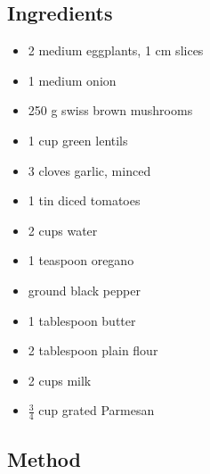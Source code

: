 \documentclass[11pt,a4paper]{article}
\begin{document}
\subsection*{Ingredients}

\begin{multicols}{2}

\begin{itemize}
  \item 2 medium eggplants, 1 cm slices
  \item 1 medium onion
  \item 250 \si{\gram} swiss brown mushrooms
  \item 1 cup green lentils
  \item 3 cloves garlic, minced
  \item 1 tin diced tomatoes
\end{itemize}

\columnbreak{}

\begin{itemize}
  \item 2 cups water
  \item 1 teaspoon oregano
  \item ground black pepper
  \item 1 tablespoon butter
  \item 2 tablespoon plain flour
  \item 2 cups milk
  \item $\frac{3}{4}$ cup grated Parmesan
\end{itemize}

\end{multicols}

\medskip

\subsection*{Method}
\end{document}
